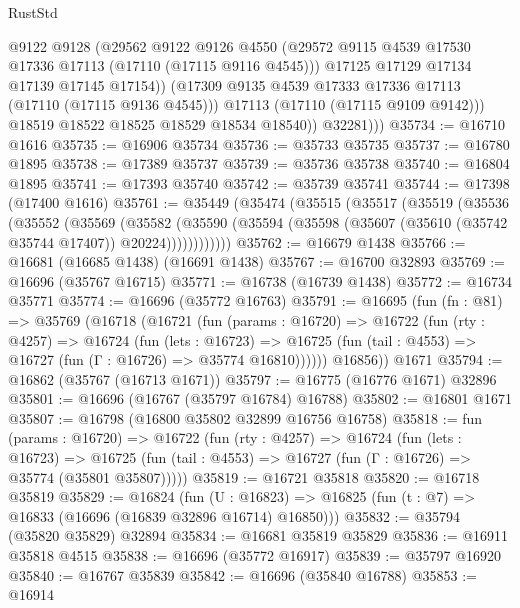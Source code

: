 \begin{lexlean}{RustStd}
\begin{coremodule}
                  @9122
                  @9128
                  (@29562
                    @9122
                    @9126
                    @4550
                    (@29572 @9115 @4539 @17530 @17336 @17113 (@17110 (@17115 @9116 @4545)))
                    @17125
                    @17129
                    @17134
                    @17139
                    @17145
                    @17154))
                (@17309 @9135 @4539 @17333 @17336 @17113 (@17110 (@17115 @9136 @4545)))
                @17113
                (@17110 (@17115 @9109 @9142)))
              @18519
              @18522
              @18525
              @18529
              @18534
              @18540))
          @32281)))
@35734 := @16710 @1616
@35735 := @16906 @35734
@35736 := @35733 @35735
@35737 := @16780 @1895
@35738 := @17389 @35737
@35739 := @35736 @35738
@35740 := @16804 @1895
@35741 := @17393 @35740
@35742 := @35739 @35741
@35744 := @17398 (@17400 @1616)
@35761 := @35449
    (@35474
      (@35515
        (@35517
          (@35519
            (@35536
              (@35552
                (@35569
                  (@35582
                    (@35590
                      (@35594 (@35598 (@35607 (@35610 (@35742 @35744 @17407)) @20224))))))))))))
@35762 := @16679 @1438
@35766 := @16681 (@16685 @1438) (@16691 @1438)
@35767 := @16700 @32893
@35769 := @16696 (@35767 @16715)
@35771 := @16738 (@16739 @1438)
@35772 := @16734 @35771
@35774 := @16696 (@35772 @16763)
@35791 := @16695
    (fun (fn : @81) =>
    @35769
      (@16718
        (@16721
          (fun (params : @16720) =>
          @16722
            (fun (rty : @4257) =>
            @16724
              (fun (lets : @16723) =>
              @16725 (fun (tail : @4553) => @16727 (fun (Γ : @16726) => @35774 @16810))))))
        @16856))
    @1671
@35794 := @16862 (@35767 (@16713 @1671))
@35797 := @16775 (@16776 @1671) @32896
@35801 := @16696 (@16767 (@35797 @16784) @16788)
@35802 := @16801 @1671
@35807 := @16798 (@16800 @35802 @32899 @16756 @16758)
@35818 := fun (params : @16720) =>
  @16722
    (fun (rty : @4257) =>
    @16724
      (fun (lets : @16723) =>
      @16725 (fun (tail : @4553) => @16727 (fun (Γ : @16726) => @35774 (@35801 @35807)))))
@35819 := @16721 @35818
@35820 := @16718 @35819
@35829 := @16824
    (fun (U : @16823) => @16825 (fun (t : @7) => @16833 (@16696 (@16839 @32896 @16714) @16850)))
@35832 := @35794 (@35820 @35829) @32894
@35834 := @16681 @35819 @35829
@35836 := @16911 @35818 @4515
@35838 := @16696 (@35772 @16917)
@35839 := @35797 @16920
@35840 := @16767 @35839
@35842 := @16696 (@35840 @16788)
@35853 := @16914

\end{coremodule}
\end{lexlean}
